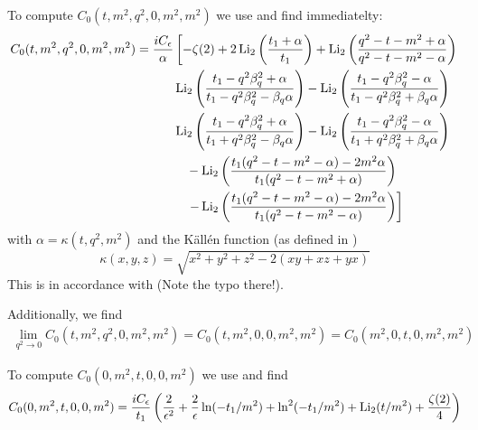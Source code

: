 To compute $C_0(t,m^2,q^2,0,m^2,m^2)$ we use \cite{Denner:1991qq} and find immediatelty:
\begin{align}
C_0(t,m^2,q^2,0,m^2,m^2) &= \frac{i C_\epsilon}{\alpha}\left[-\zeta(2)+2\operatorname{\text{Li}_2}\left(\frac{t_1+\alpha}{t_1}\right)+\operatorname{\text{Li}_2}\left(\frac{q^2-t-m^2+\alpha}{q^2-t-m^2-\alpha}\right)\right.\nonumber\\
&\hspace{30pt}\operatorname{\text{Li}_2}\left(\frac{t_1-q^2\beta_q^2+\alpha}{t_1-q^2\beta_q^2-\beta_q\alpha}\right)-\operatorname{\text{Li}_2}\left(\frac{t_1-q^2\beta_q^2-\alpha}{t_1-q^2\beta_q^2+\beta_q\alpha}\right)\nonumber\\
&\hspace{30pt}\operatorname{\text{Li}_2}\left(\frac{t_1-q^2\beta_q^2+\alpha}{t_1+q^2\beta_q^2-\beta_q\alpha}\right)-\operatorname{\text{Li}_2}\left(\frac{t_1-q^2\beta_q^2-\alpha}{t_1+q^2\beta_q^2+\beta_q\alpha}\right)\nonumber\\
&\hspace{40pt}-\operatorname{\text{Li}_2}\left(\frac{t_1(q^2-t-m^2-\alpha)-2m^2\alpha}{t_1(q^2-t-m^2+\alpha)}\right)\nonumber\\
&\hspace{40pt}\left.-\operatorname{\text{Li}_2}\left(\frac{t_1(q^2-t-m^2-\alpha)-2m^2\alpha}{t_1(q^2-t-m^2-\alpha)}\right)\right]
\end{align}
with $\alpha=\kappa(t,q^2,m^2)$ and the Källén function (as defined in \cite[eq. (4.27)]{Denner:1991qq})
\begin{equation}
\kappa(x,y,z)=\sqrt{x^2+y^2+z^2-2(xy+xz+yx)}
\end{equation}
This is in accordance with \cite[eq. (A.8)]{Laenen1993162}(Note the typo there!).

Additionally, we find
\begin{align}
\lim_{q^2\rightarrow 0}C_0(t,m^2,q^2,0,m^2,m^2) = C_0(t,m^2,0,0,m^2,m^2) = C_0(m^2,0,t,0,m^2,m^2)
\end{align}

To compute $C_0(0,m^2,t,0,0,m^2)$ we use \cite{Bojak:2000eu} and find
\begin{equation}
C_0(0,m^2,t,0,0,m^2)=\frac{iC_\epsilon}{t_1}\left(\frac 2 {\epsilon^2}+\frac 2 {\epsilon}\ln(-t_1/m^2)+\ln^2(-t_1/m^2)+\operatorname{\text{Li}_2}(t/m^2)+\frac{\zeta(2)}4\right)
\end{equation}

